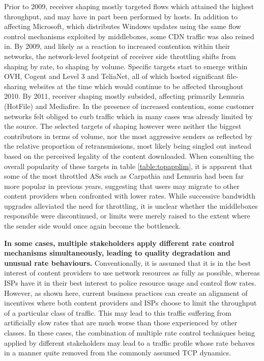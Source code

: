 Prior to 2009, receiver shaping mostly targeted flows which attained the highest throughput, and may have in part been performed by hosts. 
In addition to affecting Microsoft, which distributes Windows updates using the same flow control mechanisms exploited by middleboxes, some CDN traffic was also reined in.
By 2009, and likely as a reaction to increased contention within their networks, the network-level footprint of receiver side throttling shifts from shaping by rate, to shaping by volume.
Specific targets start to emerge within OVH, Cogent and Level 3 and TeliaNet, all of which hosted significant file-sharing websites at the time which would continue to be affected throughout 2010.
By 2011, receiver shaping mostly subsided, affecting primarily Lemuria (HotFile) and Mediafire.
In the presence of increased contention, some customer networks felt obliged to curb traffic which in many cases was already limited by the source.
The selected targets of shaping however were neither the biggest contributors in terms of volume, nor the most aggressive senders as reflected by the relative proportion of retransmissions, most likely being singled out instead based on the perceived legality of the content downloaded.
When consulting the overall popularity of these targets in table \ref{table:topapplim}, it is apparent that some of the most throttled \acp{AS} such as Carpathia and Lemuria had been far more popular in previous years, suggesting that users may migrate to other content providers when confronted with lower rates.
While successive bandwidth upgrades alleviated the need for throttling, it is unclear whether the middleboxes responsible were discontinued, or limits were merely raised to the extent where the sender side would once again become the bottleneck.

\textbf{In some cases, multiple stakeholders apply different rate control mechanisms simultaneously, leading to quality degradation and unusual rate behaviours.}
Conventionally, it is assumed that it is in the best interest of content providers to use network resources as fully as possible, whereas \acp{ISP} have it in their best interest to police resource usage and control flow rates. 
However, as shown here, current business practices can create an alignment of incentives where both content providers and \acp{ISP} choose to limit the throughput of a particular class of traffic. 
This may lead to this traffic suffering from artificially slow rates that are much worse than those experienced by other classes. 
In these cases, the combination of multiple rate control techniques being applied by different stakeholders may lead to a traffic profile whose rate behaves in a manner quite removed from the commonly assumed \ac{TCP} dynamics.

